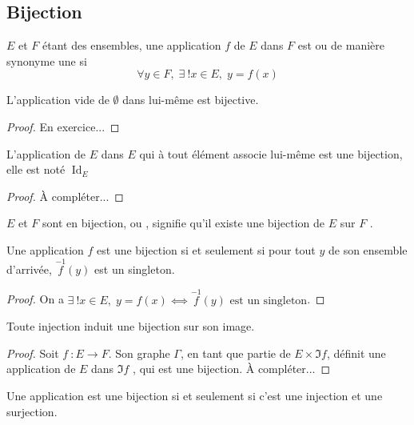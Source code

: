 \subsection{Bijection}
\begin{definition}
[Bijection]
\(𝐸\) et \(𝐹\) étant des ensembles, une application \(𝑓\) de
\(𝐸\) dans \(𝐹\) est  ou de manière synonyme une
 si
\begin{equation*}
∀𝑦∈𝐹,\;∃~!𝑥∈𝐸,\;𝑦=𝑓(𝑥)
\end{equation*}
\end{definition}
%
\begin{theorem}
L'application vide de \(∅\) dans lui-même est bijective.
\end{theorem}
\begin{proof}
En exercice...
\end{proof}
%
\begin{theorem}
L'application de \(𝐸\) dans \(𝐸\) qui à tout élément associe lui-même est une bijection, elle est noté
\(\operatorname{Id}_{𝐸}\)
\end{theorem}
\begin{proof}
À compléter...
\end{proof}
%
\begin{definition}
 \(𝐸\) et \(𝐹\) sont en bijection, ou , signifie qu'il existe une bijection de \(𝐸\)
 sur \(𝐹\) .
\end{definition}
%
\begin{theorem}
\label{thm:bijection}
Une application \(𝑓\) est une bijection si et seulement si pour tout \(𝑦\) de son ensemble d'arrivée,
\(\overset{-1}{𝑓}(𝑦)\) est un singleton.
\end{theorem}
\begin{proof}
On a \(∃~!𝑥∈𝐸,\;𝑦=𝑓(𝑥)⟺\overset{-1}{𝑓}(𝑦)\text{ est un singleton}\).
\end{proof}
\begin{theorem}
Toute injection induit une bijection sur son image.
\end{theorem}
\begin{proof}
Soit \(𝑓~:𝐸→𝐹\). Son graphe \(Γ\), en tant que partie de \(𝐸×\Im 𝑓\), définit une application de \(𝐸\) dans \(\Im
𝑓\) , qui est une bijection. À compléter...
\end{proof}
%
\begin{theorem}
\label{thm:bijection2}
Une application est une bijection si et seulement si c'est une injection et une surjection.
\end{theorem}
